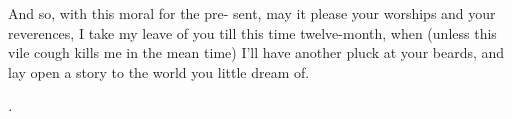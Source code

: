 \documentclass{article}
\begin{document}
And so, with this moral for the pre-\break
sent, may it please your worships and\break
your reverences, I take my leave of you\break
till this time twelve-month, when (unless\break
this vile cough kills me in the mean\break
time) I’ll have another pluck at your\break
beards, and lay open a story to the\break
world you little dream of.

\vskip 72pt
\centerline{\itshape{}.}
\end{document}
